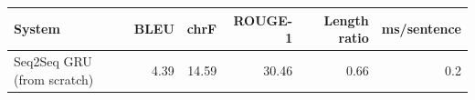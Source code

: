 \begin{tabular}{lrrrrr}
\toprule
System & BLEU & chrF & ROUGE-1 & Length ratio & ms/sentence \\
\midrule
Seq2Seq GRU (from scratch) & 4.39 & 14.59 & 30.46 & 0.66 & 0.2 \\
\bottomrule
\end{tabular}
